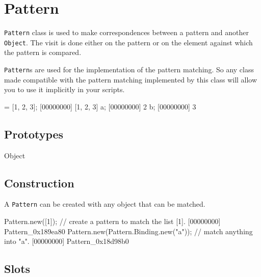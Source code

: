 
\section{Pattern}

\lstinline|Pattern| class is used to make correspondences between a pattern
and another \lstinline|Object|.  The visit is done either on the pattern or
on the element against which the pattern is compared.

\lstinline|Pattern|s are used for the implementation of the pattern matching.
So any class made compatible with the pattern matching implemented by this
class will allow you to use it implicitly in your scripts.

\begin{urbiscript} = [1, 2, 3];
[00000000] [1, 2, 3]
a;
[00000000] 2
b;
[00000000] 3
\end{urbiscript}

\subsection{Prototypes}

\begin{refObjects}
\item[Object]
\end{refObjects}

\subsection{Construction}

A \lstinline|Pattern| can be created with any object that can be matched.

\begin{urbiscript}
Pattern.new([1]); // create a pattern to match the list [1].
[00000000] Pattern_0x189ea80
Pattern.new(Pattern.Binding.new("a")); // match anything into "a".
[00000000] Pattern_0x18d98b0
\end{urbiscript}

\subsection{Slots}

